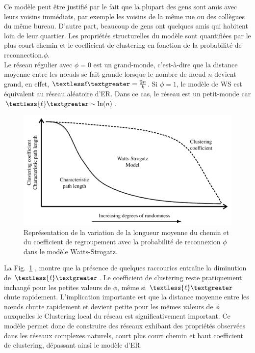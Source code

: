  Ce modèle peut être justifié par le fait que la plupart des gens sont amis avec leurs voisins immédiats, par exemple les voisins de la même rue ou des collègues du même bureau. D'autre part, beaucoup de gens ont quelques amis qui habitent loin de leur quartier. Les propriétés structurelles du modèle sont quantifiées par le plus court chemin et le coefficient de clustering en fonction de la probabilité de reconnection.$\phi$.\\
 Le réseau régulier avec $\phi=0$ est un grand-monde, c'est-à-dire que la distance moyenne entre les nœuds se fait grande lorsque le nombre de nœud $n$ devient grand, en effet, $\textless \ell \textgreater=\frac{2n}{k}$. Si $\phi=1$, le modèle de WS est équivalent au réseau aléatoire d'ER. Dans ce cas, le réseau est un petit-monde car $\textless {\ell} \textgreater \sim \ln(n)$.\\ 
 \begin{figure}[h!]
 	\centering
 	\includegraphics[scale=0.45]{./figures/fig-SW5}
 	\caption{Représentation de la variation de la longueur moyenne du chemin et du coefficient de regroupement avec la probabilité de reconnexion $\phi$ dans le modèle Watts-Strogatz.}  	
 	\label{SW2}
 \end{figure}
 La Fig.~\ref{SW2} \cite{Watss-Strogatz1998}, montre que la présence de
 quelques raccourics entraîne la diminution de $\textless {\ell} \textgreater$. Le
 coefficient de clustering reste pratiquement inchangé pour les petites valeurs de 
 $\phi$, m\^{e}me si $\textless {\ell} \textgreater$ chute rapidement. L'implication importante est que la distance moyenne entre les nœuds chutte rapidement et devient petite pour les mêmes valeurs de $\phi$ auxquelles le Clustering local du réseau est significativement important. Ce modèle permet donc de construire des réseaux exhibant des propriétés observées dans les réseaux complexes naturels, court plus court chemin  et haut coefficient de clustering, dépassant ainsi le modèle d’ER.\\
